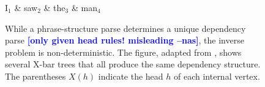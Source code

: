 \documentclass[11pt,letterpaper]{article}
\newcommand{\lpkcomment}[1]{\textcolor{red}{\bf \small [#1 --lpk]}}
\newcommand{\nascomment}[1]{\textcolor{blue}{\bf \small [#1 --nas]}}
\begin{document}

\begin{figure}
  \centering

  \vspace{-1cm}

  \begin{dependency}[theme=simple]
    \begin{deptext}[column sep=0.7cm]
      I$_1$ \& saw$_2$ \& the$_3$ \& man$_4$ \\
    \end{deptext}
  \end{dependency}

  \label{fig:inverse}
  \caption{{\footnotesize While a phrase-structure parse determines a
      unique dependency parse \nascomment{only given head rules!  misleading}, the inverse problem is
      non-deterministic. The figure, adapted from
      \cite{collins1999statistical}, shows several X-bar trees that
      all produce the same dependency structure. The parentheses
      $X(h)$ indicate the head $h$ of each internal vertex. }
    }
\end{figure}


\end{document}
